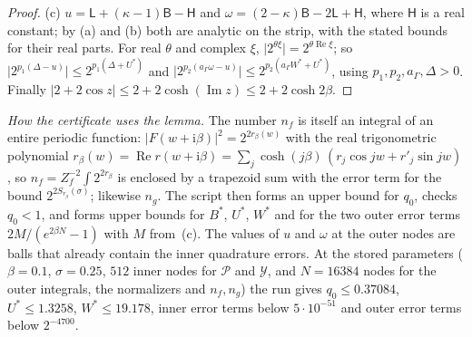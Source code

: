 \documentclass[11pt]{article}
\theoremstyle{definition}
\newcommand{\abs}[1]{\lvert #1\rvert}
\begin{document}
\begin{proof}
(c) $u=\mathsf L+(\kappa-1)\mathsf B-\mathsf H$ and $\omega=(2-\kappa)\mathsf B-2\mathsf L+\mathsf H$, where
$\mathsf H$ is a real constant; by (a) and (b) both are analytic on the strip, with the stated bounds for their
real parts. For real $\theta$ and complex $\xi$, $\abs{2^{\theta\xi}}=2^{\theta\operatorname{Re}\xi}$; so
$\abs{2^{p_1(\Delta-u)}}\le2^{p_1(\Delta+U^\ast)}$ and
$\abs{2^{p_2(a_\Gamma\omega-u)}}\le2^{p_2(a_\Gamma W^\ast+U^\ast)}$, using $p_1,p_2,a_\Gamma,\Delta>0$. Finally
$\abs{2+2\cos z}\le2+2\cosh(\operatorname{Im}z)\le2+2\cosh2\beta$.
\end{proof}

\emph{How the certificate uses the lemma.} The number $n_f$ is itself an integral of an entire periodic function:
$\abs{F(w+\mathrm i\beta)}^2=2^{2r_\beta(w)}$ with the real trigonometric polynomial
$r_\beta(w)=\operatorname{Re}r(w+\mathrm i\beta)=\sum_j\cosh(j\beta)\,(r_j\cos jw+r'_j\sin jw)$, so
$n_f=Z_f^{-2}\int2^{2r_\beta}$ is enclosed by a trapezoid sum with the error term for the bound
$2^{2S_{r_\beta}(\sigma)}$; likewise $n_g$. The script then forms an upper bound for $q_0$, checks $q_0<1$, and
forms upper bounds for $B^\ast$, $U^\ast$, $W^\ast$ and for the two outer error terms
$2M/(e^{2\beta N}-1)$ with $M$ from~(c). The values of $u$ and $\omega$ at the outer nodes are balls that already
contain the inner quadrature errors. At the stored parameters ($\beta=0.1$, $\sigma=0.25$, $512$ inner nodes for
$\mathcal P$ and $\mathcal Y$, and $N=16384$ nodes for the outer integrals, the normalizers and $n_f,n_g$) the run
gives $q_0\le0.37084$, $U^\ast\le1.3258$, $W^\ast\le19.178$, inner error terms
below $5\cdot10^{-51}$ and outer error terms below $2^{-4700}$.
\end{document}
